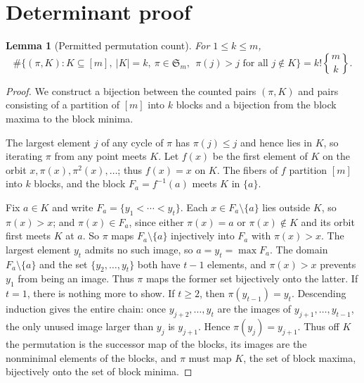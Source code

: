 \documentclass[10pt]{article} %
\newtheorem{lemma}[theorem]{Lemma}
\theoremstyle{definition}
\newcommand{\Stirling}[2]{\genfrac{\{}{\}}{0pt}{}{#1}{#2}}
\begin{document}
\section{Determinant proof}\label{app:determinant}

\begin{lemma}[Permitted permutation count]\label{lem:count}
For \(1\le k\le m\),
\[
 \#\bigl\{(\pi,K):K\subseteq[m],\ |K|=k,\ \pi\in\mathfrak S_m,\
 \ \pi(j)>j\text{ for all }j\notin K\bigr\}
 =k!\Stirling{m}{k}.
\]
\end{lemma}

\begin{proof}
We construct a bijection between the counted pairs \((\pi,K)\) and pairs
consisting of a partition of \([m]\) into \(k\) blocks and a bijection from
the block maxima to the block minima.

The largest element \(j\) of any cycle of \(\pi\) has \(\pi(j)\le j\) and
hence lies in \(K\), so iterating \(\pi\) from any point meets \(K\).  Let
\(f(x)\) be the first element of \(K\) on the orbit
\(x,\pi(x),\pi^2(x),\ldots\); thus \(f(x)=x\) on \(K\).  The fibers of \(f\)
partition \([m]\) into \(k\) blocks, and the block \(F_a=f^{-1}(a)\) meets
\(K\) in \(\{a\}\).

Fix \(a\in K\) and write \(F_a=\{y_1<\cdots<y_t\}\).  Each
\(x\in F_a\setminus\{a\}\) lies outside \(K\), so \(\pi(x)>x\); and
\(\pi(x)\in F_a\), since either \(\pi(x)=a\) or \(\pi(x)\notin K\) and its
orbit first meets \(K\) at \(a\).  So \(\pi\) maps \(F_a\setminus\{a\}\)
injectively into \(F_a\) with \(\pi(x)>x\).  The largest element \(y_t\)
admits no such image, so \(a=y_t=\max F_a\).  The domain
\(F_a\setminus\{a\}\) and the set \(\{y_2,\ldots,y_t\}\) both have
\(t-1\) elements, and \(\pi(x)>x\) prevents \(y_1\) from being an image.
Thus \(\pi\) maps the former set bijectively onto the latter.  If \(t=1\),
there is nothing more to show.  If \(t\ge2\), then
\(\pi(y_{t-1})=y_t\).  Descending induction gives the entire chain: once
\(y_{j+2},\ldots,y_t\) are the images of \(y_{j+1},\ldots,y_{t-1}\), the
only unused image larger than \(y_j\) is \(y_{j+1}\).  Hence
\(\pi(y_j)=y_{j+1}\).
Thus off \(K\) the permutation is the successor map of the blocks, its
images are the nonminimal elements of the blocks, and \(\pi\) must
map \(K\), the set of block maxima, bijectively onto the set of block
minima.


\end{proof}
\end{document}
